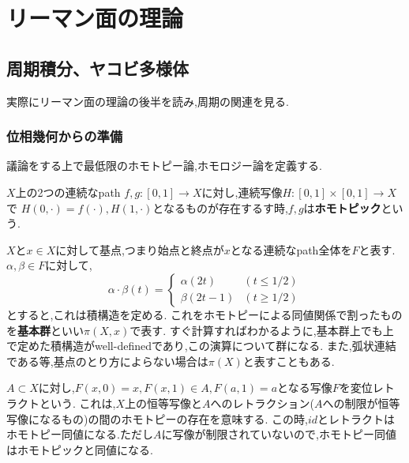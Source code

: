 \chapter{リーマン面の理論}
\section{周期積分、ヤコビ多様体}
実際にリーマン面の理論の後半を読み,周期の関連を見る.

\subsection{位相幾何からの準備}
議論をする上で最低限のホモトピー論,ホモロジー論を定義する.
\begin{screen}
\begin{dfn}
 $X$上の2つの連続なpath $f,g: [0,1] \to X$に対し,連続写像$H:[0,1] \times [0,1] \to X$で
 $H(0, \cdot) = f(\cdot), H(1, \cdot)$となるものが存在するす時,$f,g$は\textbf{ホモトピック}という.
\end{dfn}
\end{screen}

\begin{screen}
\begin{dfn}
 $X$と$x \in X$に対して基点,つまり始点と終点が$x$となる連続なpath全体を$F$と表す.$\alpha, \beta \in F$に対して,
 \begin{equation*}
 \alpha \cdot \beta (t) = \begin{cases}
    \alpha(2t) & ( t \le 1/2) \\
    \beta(2t-1) & (t \ge 1/2)
  \end{cases}
 \end{equation*}
とすると,これは積構造を定める.
これをホモトピーによる同値関係で割ったものを\textbf{基本群}といい$\pi(X,x)$で表す.
すぐ計算すればわかるように,基本群上でも上で定めた積構造がwell-definedであり,この演算について群になる.
また,弧状連結である等,基点のとり方によらない場合は$\pi(X)$と表すこともある.
\end{dfn}
\end{screen}

\begin{screen}
\begin{dfn}
 $A \subset X$に対し,$F(x, 0) = x , F(x, 1) \in A , F(a, 1) = a$となる写像$F$を変位レトラクトという.
これは,$X$上の恒等写像と$A$へのレトラクション($A$への制限が恒等写像になるもの)の間のホモトピーの存在を意味する.
この時,$id$とレトラクトはホモトピー同値になる.ただし$A$に写像が制限されていないので,ホモトピー同値はホモトピックと同値になる.
\end{dfn}
\end{screen}

